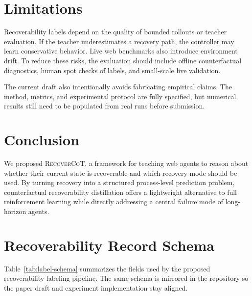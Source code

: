 \documentclass[11pt]{article}
\begin{document}
\section{Limitations}
Recoverability labels depend on the quality of bounded rollouts or teacher evaluation. If the teacher underestimates a recovery path, the controller may learn conservative behavior. Live web benchmarks also introduce environment drift. To reduce these risks, the evaluation should include offline counterfactual diagnostics, human spot checks of labels, and small-scale live validation.

The current draft also intentionally avoids fabricating empirical claims. The method, metrics, and experimental protocol are fully specified, but numerical results still need to be populated from real runs before submission.

\section{Conclusion}
We proposed \textsc{RecoverCoT}, a framework for teaching web agents to reason about whether their current state is recoverable and which recovery mode should be used. By turning recovery into a structured process-level prediction problem, counterfactual recoverability distillation offers a lightweight alternative to full reinforcement learning while directly addressing a central failure mode of long-horizon agents.

\appendix

\section{Recoverability Record Schema}
Table~\ref{tab:label-schema} summarizes the fields used by the proposed recoverability labeling pipeline. The same schema is mirrored in the repository so the paper draft and experiment implementation stay aligned.
\end{document}
